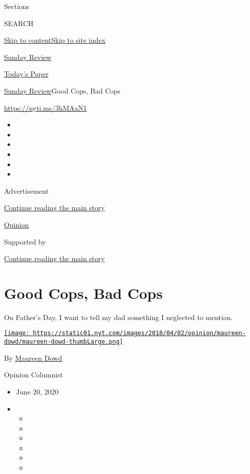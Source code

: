 Sections

SEARCH

\protect\hyperlink{site-content}{Skip to
content}\protect\hyperlink{site-index}{Skip to site index}

\href{https://www.nytimes.com/section/opinion/sunday}{Sunday Review}

\href{https://myaccount.nytimes.com/auth/login?response_type=cookie\&client_id=vi}{}

\href{https://www.nytimes.com/section/todayspaper}{Today's Paper}

\href{/section/opinion/sunday}{Sunday Review}\textbar{}Good Cops, Bad
Cops

\href{https://nyti.ms/3hMAaN1}{https://nyti.ms/3hMAaN1}

\begin{itemize}
\item
\item
\item
\item
\item
\item
\end{itemize}

Advertisement

\protect\hyperlink{after-top}{Continue reading the main story}

\href{/section/opinion}{Opinion}

Supported by

\protect\hyperlink{after-sponsor}{Continue reading the main story}

\hypertarget{good-cops-bad-cops}{%
\section{Good Cops, Bad Cops}\label{good-cops-bad-cops}}

On Father's Day, I want to tell my dad something I neglected to mention.

\href{https://www.nytimes.com/by/maureen-dowd}{\texttt{[image: https://static01.nyt.com/images/2018/04/02/opinion/maureen-dowd/maureen-dowd-thumbLarge.png]}}

By \href{https://www.nytimes.com/by/maureen-dowd}{Maureen Dowd}

Opinion Columnist

\begin{itemize}
\item
  June 20, 2020
\item
  \begin{itemize}
  \item
  \item
  \item
  \item
  \item
  \item
  \end{itemize}
\end{itemize}

